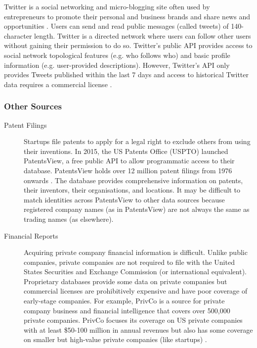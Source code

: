 \documentclass[../thesis/thesis.tex]{subfiles}
\begin{document}
\begin{refsection}
\begin{description}
Twitter is a social networking and micro-blogging site often used by entrepreneurs to promote their personal and business brands and share news and opportunities \cite{song2012}. Users can send and read public messages (called tweets) of 140-character length. Twitter is a directed network where users can follow other users without gaining their permission to do so. Twitter's public API provides access to social network topological features (e.g. who follows who) and basic profile information (e.g. user-provided descriptions). However, Twitter's API only provides Tweets published within the last 7 days and access to historical Twitter data requires a commercial license \cite{puschmann2013}.

\end{description}

\subsubsection{Other Sources}

\begin{description}

\item[Patent Filings]

Startups file patents to apply for a legal right to exclude others from using their inventions. In 2015, the US Patents Office (USPTO) launched PatentsView, a free public API to allow programmatic access to their database. PatentsView holds over 12 million patent filings from 1976 onwards \cite{schultz2016}. The database provides comprehensive information on patents, their inventors, their organisations, and locations. It may be difficult to match identities across PatentsView to other data sources because registered company names (as in PatentsView) are not always the same as trading names (as elsewhere).

\item[Financial Reports]

Acquiring private company financial information is difficult. Unlike public companies, private companies are not required to file with the United States Securities and Exchange Commission (or international equivalent). Proprietary databases provide some data on private companies but commercial licenses are prohibitively expensive and have poor coverage of early-stage companies. For example, PrivCo is a source for private company business and financial intelligence that covers over 500,000 private companies. PrivCo focuses its coverage on US private companies with at least \$50-100 million in annual revenues but also has some coverage on smaller but high-value private companies (like startups) \cite{artemchik2015}.


\end{description}
\end{refsection}
\end{document}
